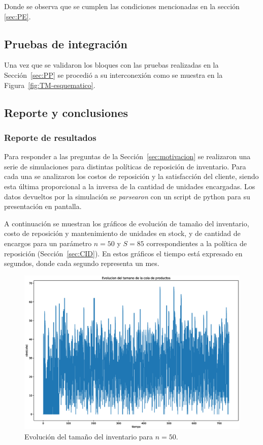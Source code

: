 \documentclass[10pt]{article}
\begin{document}
Donde se observa que se cumplen las condiciones mencionadas en la sección \ref{sec:PE}.

\subsection{Pruebas de integración}
Una vez que se validaron los bloques con las pruebas realizadas en la Sección~\ref{sec:PP} se procedió a su interconexión como se muestra en la Figura~\ref{fig:TM-esquematico}.

\subsection{Reporte y conclusiones}
\subsubsection{Reporte de resultados}
Para responder a las preguntas de la Sección~\ref{sec:motivacion} se realizaron una serie de simulaciones para distintas políticas de reposición de inventario. Para cada una se analizaron los costos de reposición y la satisfacción del cliente, siendo esta última proporcional a la inversa de la cantidad de unidades encargadas.
Los datos devueltos por la simulación se \textit{parsearon} con un script de python para su presentación en pantalla.

A continuación se muestran los gráficos de evolución de tamaño del inventario, costo de reposición y mantenimiento de unidades en stock, y de cantidad de encargos para un parámetro $n=50$ y $S=85$ correspondientes a la política de reposición (Sección~\ref{sec:CID}). En estos gráficos el tiempo está expresado en segundos, donde cada segundo representa un mes.

\begin{figure}[h]
	\centering 
	\includegraphics[width=1\textwidth]{img/EvolucionInventario50} 
	\caption{Evolución del tamaño del inventario para $n=50$.} 
	\label{fig:EvolucionInventario50} 
\end{figure}
\end{document}

